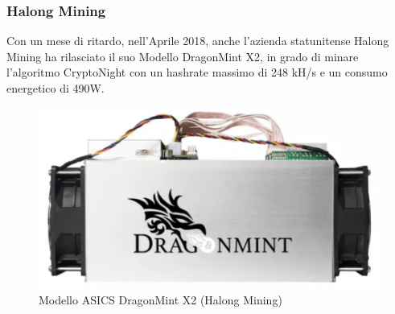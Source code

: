 \subsubsection{Halong Mining}
Con un mese di ritardo, nell'Aprile 2018, anche l'azienda statunitense Halong Mining ha rilasciato il suo Modello DragonMint X2, in grado di minare l'algoritmo CryptoNight con un hashrate massimo di 248 kH/s e un consumo energetico di 490W.

\begin{figure}[h!]
    \centering
    \includegraphics[width=0.2\linewidth]{images/DragonMint X2.png}
    \caption{Modello ASICS DragonMint X2 (Halong Mining)}
\end{figure}

